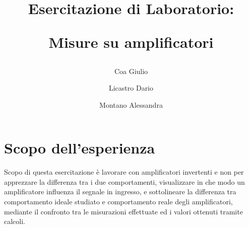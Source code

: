 \documentclass[a4paper]{article}
\title{
	\begin{center}
		Esercitazione di Laboratorio:
	\end{center}
	\newline
	\begin{center}
		Misure su amplificatori
	\end{center}
}
\author{
	Coa Giulio
	\and
	Licastro Dario
	\and
	Montano Alessandra
}
\begin{document}
	\begin{titlingpage}
		\maketitle
	\end{titlingpage}
	\newpage
	\section{Scopo dell'esperienza}
		Scopo di questa esercitazione è lavorare con amplificatori invertenti e non per apprezzare la differenza tra i due comportamenti, visualizzare in che modo un amplificatore influenza il segnale in ingresso, e sottolineare la differenza tra comportamento ideale studiato e comportamento reale degli amplificatori, mediante il confronto tra le misurazioni effettuate ed i valori ottenuti tramite calcoli.
\end{document}
